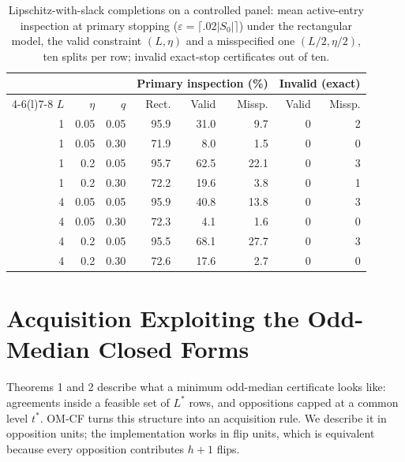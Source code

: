 \documentclass[11pt]{article}
\newcommand{\Sz}{S_0}
\begin{document}
\begin{table}[t]
\centering\small
\setlength{\tabcolsep}{3pt}
\begin{tabular}{@{}rrr rrr rr@{}}
\toprule
& & & \multicolumn{3}{c}{Primary inspection (\%)} & \multicolumn{2}{c}{Invalid (exact)}\\
\cmidrule(lr){4-6}\cmidrule(l){7-8}
$L$ & $\eta$ & $q$ & Rect. & Valid & Missp. & Valid & Missp.\\
\midrule
1 & 0.05 & 0.05 & 95.9 & 31.0 & 9.7 & 0 & 2\\
1 & 0.05 & 0.30 & 71.9 & 8.0 & 1.5 & 0 & 0\\
1 & 0.2 & 0.05 & 95.7 & 62.5 & 22.1 & 0 & 3\\
1 & 0.2 & 0.30 & 72.2 & 19.6 & 3.8 & 0 & 1\\
4 & 0.05 & 0.05 & 95.9 & 40.8 & 13.8 & 0 & 3\\
4 & 0.05 & 0.30 & 72.3 & 4.1 & 1.6 & 0 & 0\\
4 & 0.2 & 0.05 & 95.5 & 68.1 & 27.7 & 0 & 3\\
4 & 0.2 & 0.30 & 72.6 & 17.6 & 2.7 & 0 & 0\\
\bottomrule
\end{tabular}
\caption{Lipschitz-with-slack completions on a controlled panel: mean active-entry inspection at primary stopping ($\varepsilon=\lceil.02|\Sz|\rceil$) under the rectangular model, the valid constraint $(L,\eta)$ and a misspecified one $(L/2,\eta/2)$, ten splits per row; invalid exact-stop certificates out of ten.}
\label{tab:lipschitz}
\end{table}

\section{Acquisition Exploiting the Odd-Median Closed Forms}
\label{app:omcf}
Theorems 1 and 2 describe what a minimum odd-median certificate looks like: agreements inside a feasible set of $L^*$ rows, and oppositions capped at a common level $t^*$. OM-CF turns this structure into an acquisition rule. We describe it in opposition units; the implementation works in flip units, which is equivalent because every opposition contributes $h+1$ flips.
\end{document}
